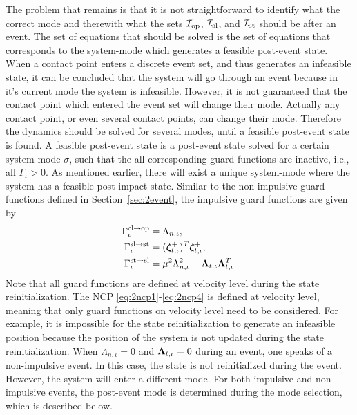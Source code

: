 \documentclass[../DC2017114Bouma.tex]{subfiles}
\begin{document}
The problem that remains is that it is not straightforward to identify what the correct mode and therewith what the sets $\mathcal{I}_{\textnormal{op}}$, $\mathcal{I}_{\textnormal{sl}}$, and $\mathcal{I}_{\textnormal{st}}$ should be after an event. The set of equations that should be solved is the set of equations that corresponds to the system-mode which generates a feasible post-event state. When a contact point enters a discrete event set, and thus generates an infeasible state, it can be concluded that the system will go through an event because in it's current mode the system is infeasible. However, it is not guaranteed that the contact point which entered the event set will change their mode. Actually any contact point, or even several contact points, can change their mode. Therefore the dynamics should be solved for several modes, until a feasible post-event state is found. A feasible post-event state is a post-event state solved for a certain system-mode $\sigma$, such that the all corresponding guard functions are inactive, i.e., all $\Gamma_{\iota}>0$. As mentioned earlier, there will exist a unique system-mode where the system has a feasible post-impact state. Similar to the non-impulsive guard functions defined in Section~\ref{sec:2event}, the impulsive guard functions are given by
\begin{align}
\Gamma^{\text{cl}\rightarrow\text{op}}_{\iota} &= \Lambda_{n,\iota},\\
\Gamma^{\text{sl}\rightarrow\text{st}}_{\iota} &= (\boldsymbol{\zeta}^+_{t,\iota})^T\boldsymbol{\zeta}^+_{t,\iota},\\
\Gamma^{\text{st}\rightarrow\text{sl}}_{\iota} &= \mu^2\Lambda_{n,\iota}^2 - \boldsymbol{\Lambda}_{t,\iota}\boldsymbol{\Lambda}_{t,\iota}^T.
\end{align}
Note that all guard functions are defined at velocity level during the state reinitialization. The NCP \eqref{eq:2ncp1}-\eqref{eq:2ncp4} is defined at velocity level, meaning that only guard functions on velocity level need to be considered. For example, it is impossible for the state reinitialization to generate an infeasible position because the position of the system is not updated during the state reinitialization. When $\Lambda_{n,\iota} = 0$ and $\boldsymbol{\Lambda}_{t,\iota} = 0$ during an event, one speaks of a non-impulsive event. In this case, the state is not reinitialized during the event. However, the system will enter a different mode. For both impulsive and non-impulsive events, the post-event mode is determined during the mode selection, which is described below.
\end{document}
